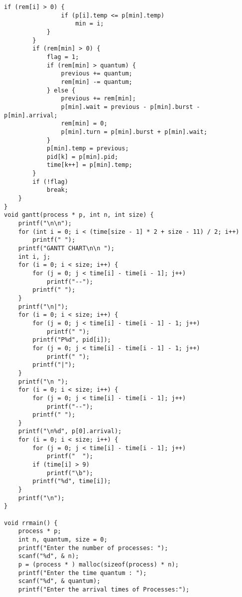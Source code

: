 \documentclass{article}
\begin{document}
\begin{Verbatim}[tabsize = 4]
            if (rem[i] > 0) {
                if (p[i].temp <= p[min].temp)
                    min = i;
            }
        }
        if (rem[min] > 0) {
            flag = 1;
            if (rem[min] > quantum) {
                previous += quantum;
                rem[min] -= quantum;
            } else {
                previous += rem[min];
                p[min].wait = previous - p[min].burst - p[min].arrival;
                rem[min] = 0;
                p[min].turn = p[min].burst + p[min].wait;
            }
            p[min].temp = previous;
            pid[k] = p[min].pid;
            time[k++] = p[min].temp;
        }
        if (!flag)
            break;
    }
}
void gantt(process * p, int n, int size) {
    printf("\n\n");
    for (int i = 0; i < (time[size - 1] * 2 + size - 11) / 2; i++)
        printf(" ");
    printf("GANTT CHART\n\n ");
    int i, j;
    for (i = 0; i < size; i++) {
        for (j = 0; j < time[i] - time[i - 1]; j++)
            printf("--");
        printf(" ");
    }
    printf("\n|");
    for (i = 0; i < size; i++) {
        for (j = 0; j < time[i] - time[i - 1] - 1; j++)
            printf(" ");
        printf("P%d", pid[i]);
        for (j = 0; j < time[i] - time[i - 1] - 1; j++)
            printf(" ");
        printf("|");
    }
    printf("\n ");
    for (i = 0; i < size; i++) {
        for (j = 0; j < time[i] - time[i - 1]; j++)
            printf("--");
        printf(" ");
    }
    printf("\n%d", p[0].arrival);
    for (i = 0; i < size; i++) {
        for (j = 0; j < time[i] - time[i - 1]; j++)
            printf("  ");
        if (time[i] > 9)
            printf("\b");
        printf("%d", time[i]);
    }
    printf("\n");
}

void rrmain() {
    process * p;
    int n, quantum, size = 0;
    printf("Enter the number of processes: ");
    scanf("%d", & n);
    p = (process * ) malloc(sizeof(process) * n);
    printf("Enter the time quantum : ");
    scanf("%d", & quantum);
    printf("Enter the arrival times of Processes:");


\end{Verbatim}
\end{document}
